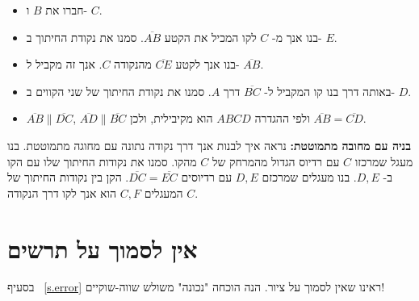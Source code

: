 \begin{itemize}
\item
חברו את
$B$
ו-%
$C$.
\item
בנו אנך מ-%
$C$
לקו המכיל את הקטע
$\overline{AB}$.
סמנו את נקודת החיתוך ב-%
$E$.
\item
בנו אנך לקטע
$\overline{CE}$
מהנקודה
$C$.
אנך זה מקביל ל-%
$\overline{AB}$.
\item
באותה דרך בנו קו המקביל ל-%
$\overline{BC}$
דרך 
$A$.
סמנו את נקודת החיתוך של שני הקווים ב-%
$D$.
\item
$\overline{AB}\|\overline{DC}$, $\overline{AD}\|\overline{BC}$
ולפי ההגדרה
$ABCD$
הוא מקיבילית, ולכן 
$\overline{AB}=\overline{CD}$.
\end{itemize}

\textbf{בניה עם מחובה מתמוטטת:}
נראה איך לבנות אנך דרך נקודה נתונה עם מחוגה מתמוטטת. בנו מעגל שמרכזו
$C$
עם רדיוס הגדול מהמרחק של
$C$
מהקו. סמנו את נקודות החיתוך שלו עם הקו ב-%
$D,E$.
בנו מעגלים שמרכזם
$D,E$
עם רדיוסים
$\overline{DC}=\overline{EC}$.
הקן בין נקודות החיתוך של המעגלים
$C,F$
הוא אנך לקו דרך הנקודה 
$C$.
\begin{center}
\end{center}



\section{
אין לסמוך על תרשים
}
בסעיף~%
\ref{s.error}
ראינו שאין לסמוך על ציור. הנה הוכחה "נכונה"
\textbf{}
משולש שווה-שוקיים!

